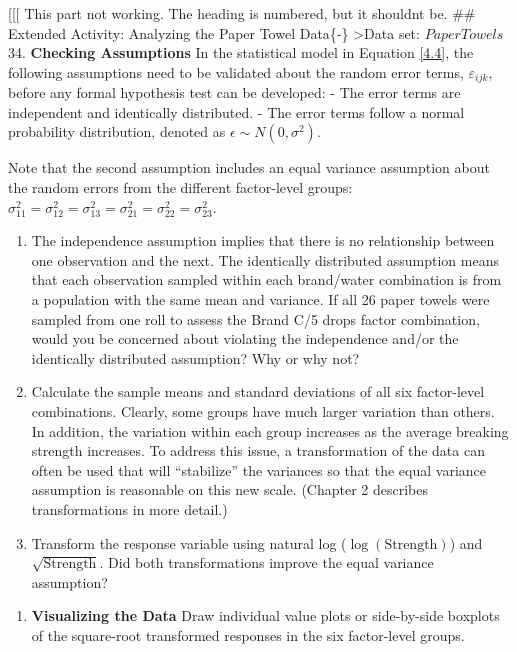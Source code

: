 \documentclass[
]{report}
\providecommand{\tightlist}{%
  \setlength{\itemsep}{0pt}\setlength{\parskip}{0pt}}
\begin{document}
{[}{[}{[} This part not working. The heading is numbered, but it shouldnt be.
\#\# Extended Activity: Analyzing the Paper Towel Data\{‑\}
\textgreater Data set: \(PaperTowels\)\\
34. \textbf{Checking Assumptions} In the statistical model in Equation \ref{4.4}, the following assumptions need to be validated about the random error terms, \(\varepsilon_{ijk}\), before any formal hypothesis test can be developed:
- The error terms are independent and identically distributed.
- The error terms follow a normal probability distribution, denoted as \(\epsilon \sim N(0, \sigma^2)\).

Note that the second assumption includes an equal variance assumption about the random errors from the different factor-level groups: \(\sigma_{11}^2 = \sigma_{12}^2 = \sigma_{13}^2 = \sigma_{21}^2 = \sigma_{22}^2 = \sigma_{23}^2\).

\begin{enumerate}
\def\labelenumi{\alph{enumi}.}
\item
  The independence assumption implies that there is no relationship between one observation and the next. The identically distributed assumption means that each observation sampled within each brand/water combination is from a population with the same mean and variance. If all 26 paper towels were sampled from one roll to assess the Brand C/5 drops factor combination, would you be concerned about violating the independence and/or the identically distributed assumption? Why or why not?
\item
  Calculate the sample means and standard deviations of all six factor-level combinations. Clearly, some groups have much larger variation than others. In addition, the variation within each group increases as the average breaking strength increases. To address this issue, a transformation of the data can often be used that will ``stabilize'' the variances so that the equal variance assumption is reasonable on this new scale. (Chapter 2 describes transformations in more detail.)
\item
  Transform the response variable using natural log (\(\log(\text{Strength})\)) and \(\sqrt{\text{Strength}}\). Did both transformations improve the equal variance assumption?
\end{enumerate}

\begin{enumerate}
\def\labelenumi{\arabic{enumi}.}
\setcounter{enumi}{34}
\tightlist
\item
  \textbf{Visualizing the Data} Draw individual value plots or side-by-side boxplots of the square-root transformed responses in the six factor-level groups.
\end{enumerate}
\end{document}
